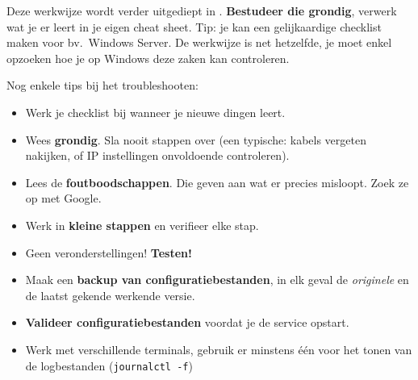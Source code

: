 Deze werkwijze wordt verder uitgediept in \textcite{VanVreckem2015}. \textbf{Bestudeer die grondig}, verwerk wat je er leert in je eigen cheat sheet. Tip: je kan een gelijkaardige checklist maken voor bv.~Windows Server. De werkwijze is net hetzelfde, je moet enkel opzoeken hoe je op Windows deze zaken kan controleren.

Nog enkele tips bij het troubleshooten:
\begin{itemize}
  \item Werk je checklist bij wanneer je nieuwe dingen leert.
  \item Wees \textbf{grondig}. Sla nooit stappen over (een typische: kabels vergeten nakijken, of IP instellingen onvoldoende controleren).
  \item Lees de \textbf{foutboodschappen}. Die geven aan wat er precies misloopt. Zoek ze op met Google.
  \item Werk in \textbf{kleine stappen} en verifieer elke stap.
  \item Geen veronderstellingen! \textbf{Testen!}
  \item Maak een \textbf{backup van configuratiebestanden}, in elk geval de \emph{originele} en de laatst gekende werkende versie.
  \item \textbf{Valideer configuratiebestanden} voordat je de service opstart.
  \item Werk met verschillende terminals, gebruik er minstens één voor het tonen van de logbestanden (\texttt{journalctl -f})
\end{itemize}
